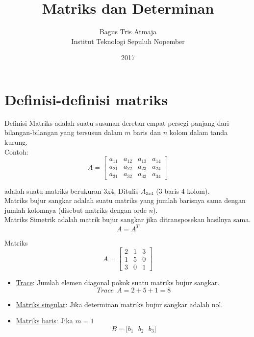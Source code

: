 \documentclass{beamer}
\title{Matriks dan Determinan}
\author{Bagus Tris Atmaja\\Institut Teknologi Sepuluh Nopember}
\date{2017}
\begin{document}
	\frame{\titlepage}
	
\section{Definisi-definisi matriks}
\begin{frame}[t,fragile]{Definisi}
Matriks adalah suatu susunan deretan empat persegi panjang dari bilangan-bilangan yang tersusun dalam $m$ baris dan $n$ kolom dalam tanda kurung.\\
Contoh:\\

$$A = \begin{bmatrix}
  a_{11} & a_{12} & a_{13} & a_{14}\\
  a_{21} & a_{22} & a_{23} & a_{24}\\
  a_{31} & a_{32} & a_{33} & a_{34}
 \end{bmatrix} $$

adalah suatu matriks berukuran 3x4. Ditulis $A_{3x4}$ (3 baris 4 kolom).\\
Matriks bujur sangkar adalah suatu matriks yang jumlah barisnya sama dengan jumlah kolomnya (disebut matriks dengan orde $n$).\\
Matriks Simetrik adalah matrik bujur sangkar jika ditransposekan hasilnya sama.\\
$$A = A^T$$
\end{frame}

\begin{frame}[t,fragile]{Matriks}
$$A = \begin{bmatrix}
    2 & 1 & 3 \\
    1 & 5 & 0 \\
    3 & 0 & 1
   \end{bmatrix} $$

\begin{itemize}
\item \underline{Trace}: Jumlah elemen diagonal pokok suatu matriks bujur sangkar.\\
$$Trace~~A = 2 + 5 + 1 = 8$$
\item \underline{Matriks singular}: Jika determinan matriks bujur sangkar adalah nol.
\item \underline{Matriks baris}: Jika $m=1$\\
$$ B = \bigl[ b_1 ~~~ b_2 ~~~ b_3 \bigr]$$ 
\end{itemize}
\end{frame}
\end{document}
